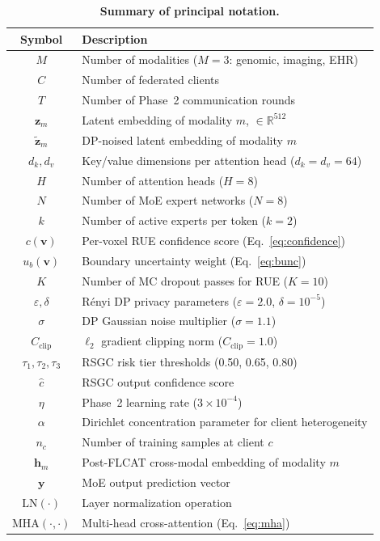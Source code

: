 \documentclass[a4paper,fleqn]{cas-dc}
\begin{document}
\begin{table}[!t]
\caption{\textbf{Summary of principal notation.}}
\label{tab:notation}
\centering
\renewcommand{\arraystretch}{1.18}
\begin{tabular}{cl}
\toprule
\textbf{Symbol} & \textbf{Description}\\
\midrule
$M$ & Number of modalities ($M\!=\!3$: genomic, imaging, EHR)\\
$C$ & Number of federated clients\\
$T$ & Number of Phase~2 communication rounds\\
$\mathbf{z}_m$ & Latent embedding of modality $m$, $\in\!\mathbb{R}^{512}$\\
$\tilde{\mathbf{z}}_m$ & DP-noised latent embedding of modality $m$\\
$d_k, d_v$ & Key/value dimensions per attention head ($d_k\!=\!d_v\!=\!64$)\\
$H$ & Number of attention heads ($H\!=\!8$)\\
$N$ & Number of MoE expert networks ($N\!=\!8$)\\
$k$ & Number of active experts per token ($k\!=\!2$)\\
$c(\mathbf{v})$ & Per-voxel RUE confidence score (Eq.~\ref{eq:confidence})\\
$u_b(\mathbf{v})$ & Boundary uncertainty weight (Eq.~\ref{eq:bunc})\\
$K$ & Number of MC dropout passes for RUE ($K\!=\!10$)\\
$\varepsilon, \delta$ & R\'{e}nyi DP privacy parameters ($\varepsilon\!=\!2.0$, $\delta\!=\!10^{-5}$)\\
$\sigma$ & DP Gaussian noise multiplier ($\sigma\!=\!1.1$)\\
$C_{\mathrm{clip}}$ & $\ell_2$ gradient clipping norm ($C_{\mathrm{clip}}\!=\!1.0$)\\
$\tau_1,\tau_2,\tau_3$ & RSGC risk tier thresholds (0.50, 0.65, 0.80)\\
$\hat{c}$ & RSGC output confidence score\\
$\eta$ & Phase~2 learning rate ($3\!\times\!10^{-4}$)\\
$\alpha$ & Dirichlet concentration parameter for client heterogeneity\\
$n_c$ & Number of training samples at client $c$\\
$\mathbf{h}_m$ & Post-FLCAT cross-modal embedding of modality $m$\\
$\mathbf{y}$ & MoE output prediction vector\\
$\mathrm{LN}(\cdot)$ & Layer normalization operation\\
$\mathrm{MHA}(\cdot,\cdot)$ & Multi-head cross-attention (Eq.~\ref{eq:mha})\\
\bottomrule
\end{tabular}
\end{table}
\end{document}
